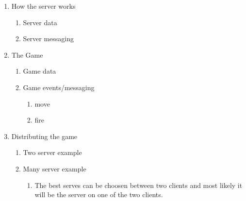 \begin{enumerate}
	\item How the server works
	\begin{enumerate}
		\item Server data
		\item Server messaging
	\end{enumerate}
	\item The Game
	\begin{enumerate}
		\item Game data
		\item Game events/messaging
		\begin{enumerate}
			\item move
			\item fire
		\end{enumerate}
	\end{enumerate}
	\item Distributing the game
	\begin{enumerate}
		\item {Two server example}
		\item {Many server example}
		\begin{enumerate}
			\item The best serves can be choosen between two clients and most likely it will be the server on one of the two clients.
		\end{enumerate}
	\end{enumerate}
\end{enumerate}

